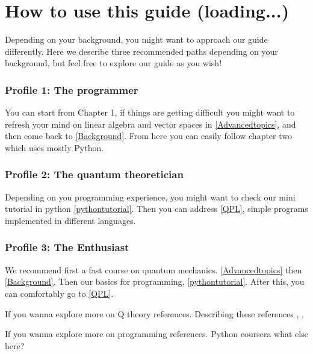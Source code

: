 
\chapter*{How to use this guide (loading...)}

Depending on your background, you might want to approach our guide differently. Here we describe three recommended paths depending on your background, but feel free to explore our guide as you wish!

\subsection*{Profile 1: The programmer}

You can start from Chapter 1, if things are getting difficult you might want to refresh your mind on linear algebra and vector spaces in \autoref{Advancedtopics}, and then come back to \autoref{Background}. From here you can easily follow chapter two which uses mostly Python.

\subsection*{Profile 2: The quantum theoretician}

Depending on you programming experience, you might want to check our mini tutorial in python \autoref{pythontutorial}. Then you can address \autoref{QPL}, simple programs implemented in different languages.

\subsection*{Profile 3: The Enthusiast}

We recommend first a fast course on quantum mechanics. \autoref{Advancedtopics} then \autoref{Background}. Then our basics for programming, \autoref{pythontutorial}. After this, you can comfortably go to \autoref{QPL}.

\vspace{1cm}

\noindent
If you wanna explore more on Q theory references. Describing these references \cite{nielsen_chuang_2010}, \cite{Preskill}, \cite{Watrous}

\noindent
If you wanna explore more on programming references. Python coursera \cite{PythonCoursera} what else here?